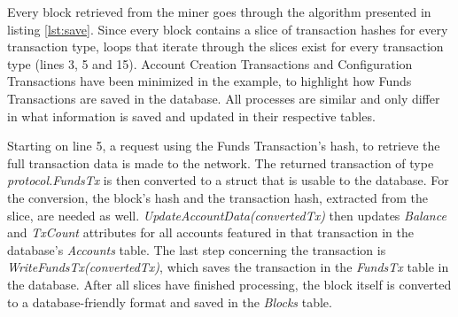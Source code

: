 Every block retrieved from the miner goes through the algorithm presented in listing \ref{lst:save}. Since every block contains a slice of transaction hashes for every transaction type, loops that iterate through the slices exist for every transaction type (lines 3, 5 and 15). Account Creation Transactions and Configuration Transactions have been minimized in the example, to highlight how Funds Transactions are saved in the database. All processes are similar and only differ in what information is saved and updated in their respective tables.

Starting on line 5, a request using the Funds Transaction's hash, to retrieve the full transaction data is made to the network. The returned transaction of type \emph{protocol.FundsTx} is then converted to a struct that is usable to the database. For the conversion, the block's hash and the transaction hash, extracted from the slice, are needed as well. \emph{UpdateAccountData(convertedTx)} then updates \emph{Balance} and \emph{TxCount} attributes for all accounts featured in that transaction in the database's \emph{Accounts} table. The last step concerning the transaction is \emph{WriteFundsTx(convertedTx)}, which saves the transaction in the \emph{FundsTx} table in the database. After all slices have finished processing, the block itself is converted to a database-friendly format and saved in the \emph{Blocks} table.

